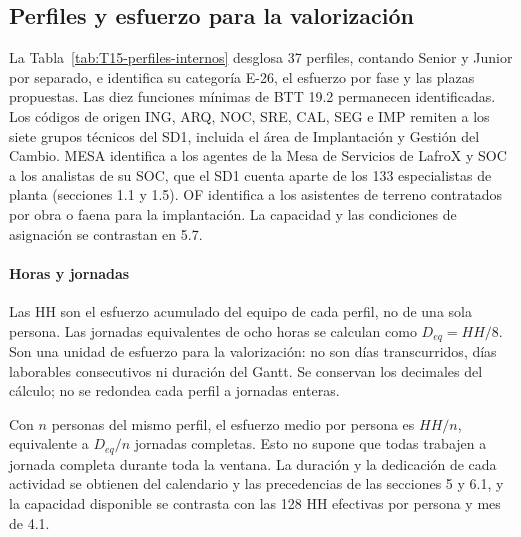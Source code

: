 \subsection{Perfiles y esfuerzo para la valorización}
\label{sec:T15-perfiles-internos}

La Tabla~\ref{tab:T15-perfiles-internos} desglosa 37 perfiles, contando Senior y Junior por separado, e identifica su categoría E-26, el esfuerzo por fase y las plazas propuestas. Las diez funciones mínimas de BTT 19.2 permanecen identificadas. Los códigos de origen ING, ARQ, NOC, SRE, CAL, SEG e IMP remiten a los siete grupos técnicos del SD1, incluida el área de Implantación y Gestión del Cambio. MESA identifica a los agentes de la Mesa de Servicios de LafroX y SOC a los analistas de su SOC, que el SD1 cuenta aparte de los 133 especialistas de planta (secciones 1.1 y 1.5). OF identifica a los asistentes de terreno contratados por obra o faena para la implantación. La capacidad y las condiciones de asignación se contrastan en 5.7.

\paragraph{Horas y jornadas}
Las HH son el esfuerzo acumulado del equipo de cada perfil, no de una sola persona. Las jornadas equivalentes de ocho horas se calculan como $D_{eq}=HH/8$. Son una unidad de esfuerzo para la valorización: no son días transcurridos, días laborables consecutivos ni duración del Gantt. Se conservan los decimales del cálculo; no se redondea cada perfil a jornadas enteras.

Con $n$ personas del mismo perfil, el esfuerzo medio por persona es $HH/n$, equivalente a $D_{eq}/n$ jornadas completas. Esto no supone que todas trabajen a jornada completa durante toda la ventana. La duración y la dedicación de cada actividad se obtienen del calendario y las precedencias de las secciones 5 y 6.1, y la capacidad disponible se contrasta con las 128 HH efectivas por persona y mes de 4.1.

